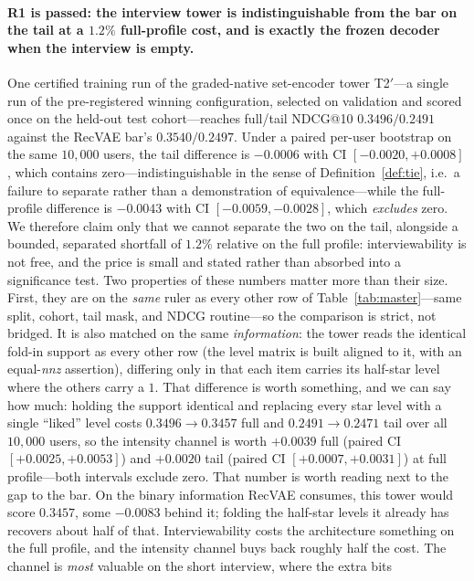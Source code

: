 \documentclass[11pt]{article}
\begin{document}
\paragraph{R1 is passed: the interview tower is indistinguishable from the bar on the tail at a $1.2\%$ full-profile cost, and is exactly the frozen decoder when the interview is
empty.} One certified training run of the graded-native set-encoder tower T2$'$---a single run of the pre-registered
winning configuration, selected on validation and scored once on the held-out test cohort---reaches full/tail NDCG@10
$\mathbf{0.3496/0.2491}$ against the RecVAE bar's $0.3540/0.2497$. Under a paired per-user bootstrap on the same
$10{,}000$ users, the tail difference is $-0.0006$ with CI $[-0.0020,+0.0008]$, which contains zero---indistinguishable in
the sense of Definition~\ref{def:tie}, i.e.\ a failure to separate rather than a demonstration of equivalence---while the full-profile difference is $-0.0043$ with CI $[-0.0059,-0.0028]$, which
\emph{excludes} zero. We therefore claim only that we cannot separate the two on the tail, alongside a bounded, separated shortfall of $1.2\%$ relative on
the full profile: interviewability is not free, and the price is small and stated rather than absorbed into a
significance test. Two properties of these numbers matter more than their size. First,
they are on the \emph{same} ruler as every other row of Table~\ref{tab:master}---same split, cohort, tail mask, and NDCG
routine---so the comparison is strict, not bridged. It is also matched on the same
\emph{information}: the tower reads the identical fold-in support as every other row (the level matrix is
built aligned to it, with an equal-\emph{nnz} assertion), differing only in that each item carries its
half-star level where the others carry a $1$. That difference is worth something, and we can say how much:
holding the support identical and replacing every star level with a single ``liked'' level costs
$0.3496\rightarrow0.3457$ full and $0.2491\rightarrow0.2471$ tail over all $10{,}000$ users, so the
intensity channel is worth $+0.0039$ full (paired CI $[+0.0025,+0.0053]$) and $+0.0020$ tail (paired CI $[+0.0007,+0.0031]$) at full profile---both intervals exclude zero. That number is worth reading
next to the gap to the bar. On the binary information RecVAE consumes, this tower would score $0.3457$,
some $-0.0083$ behind it; folding the half-star levels it already has recovers about half of that.
Interviewability costs the architecture something on the full profile, and the intensity channel buys back
roughly half the cost. The channel is \emph{most} valuable on the short interview, where the extra bits
\end{document}

